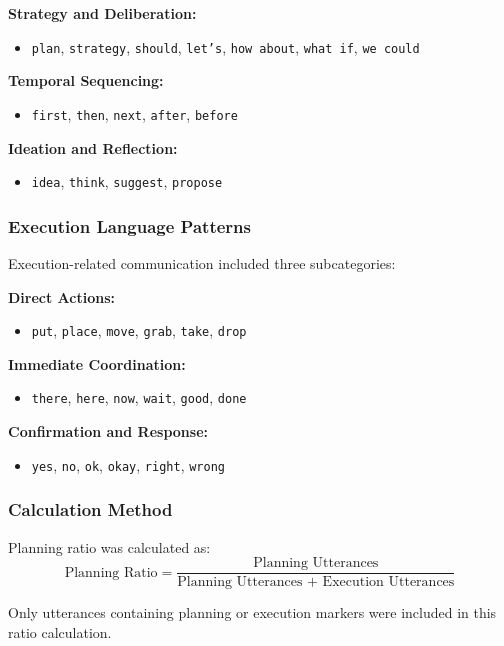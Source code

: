 \textbf{Strategy and Deliberation:}
\begin{itemize}
\item \texttt{plan}, \texttt{strategy}, \texttt{should}, \texttt{let's}, \texttt{how about}, \texttt{what if}, \texttt{we could}
\end{itemize}

\textbf{Temporal Sequencing:}
\begin{itemize}
\item \texttt{first}, \texttt{then}, \texttt{next}, \texttt{after}, \texttt{before}
\end{itemize}

\textbf{Ideation and Reflection:}
\begin{itemize}
\item \texttt{idea}, \texttt{think}, \texttt{suggest}, \texttt{propose}
\end{itemize}

\subsubsection{Execution Language Patterns}
Execution-related communication included three subcategories:

\textbf{Direct Actions:}
\begin{itemize}
\item \texttt{put}, \texttt{place}, \texttt{move}, \texttt{grab}, \texttt{take}, \texttt{drop}
\end{itemize}

\textbf{Immediate Coordination:}
\begin{itemize}
\item \texttt{there}, \texttt{here}, \texttt{now}, \texttt{wait}, \texttt{good}, \texttt{done}
\end{itemize}

\textbf{Confirmation and Response:}
\begin{itemize}
\item \texttt{yes}, \texttt{no}, \texttt{ok}, \texttt{okay}, \texttt{right}, \texttt{wrong}
\end{itemize}

\subsubsection{Calculation Method}
Planning ratio was calculated as:
$$\text{Planning Ratio} = \frac{\text{Planning Utterances}}{\text{Planning Utterances + Execution Utterances}}$$

Only utterances containing planning or execution markers were included in this ratio calculation.

